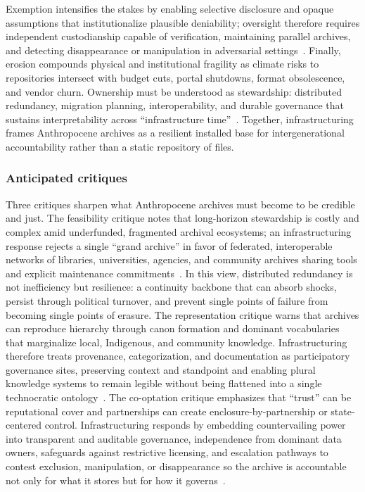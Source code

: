 \documentclass[acmsmall,screen]{acmart}
\begin{document}
Exemption intensifies the stakes by enabling selective disclosure and opaque assumptions that institutionalize plausible deniability; oversight therefore requires independent custodianship capable of verification, maintaining parallel archives, and detecting disappearance or manipulation in adversarial settings~\cite{viebachEvidenceUseArchives2022,ghaddarSpectreArchiveTruth2016}. Finally, erosion compounds physical and institutional fragility as climate risks to repositories intersect with budget cuts, portal shutdowns, format obsolescence, and vendor churn. Ownership must be understood as stewardship: distributed redundancy, migration planning, interoperability, and durable governance that sustains interpretability across ``infrastructure time''~\cite{rydenArchivistsTimeConceptions2019,danielaagostinhoBigDataTime2016,wessellKeepingArchivesWater2023}. Together, infrastructuring frames Anthropocene archives as a resilient installed base for intergenerational accountability rather than a static repository of files.

\subsubsection*{Anticipated critiques}
Three critiques sharpen what Anthropocene archives must become to be credible and just. The feasibility critique notes that long-horizon stewardship is costly and complex amid underfunded, fragmented archival ecosystems; an infrastructuring response rejects a single ``grand archive'' in favor of federated, interoperable networks of libraries, universities, agencies, and community archives sharing tools and explicit maintenance commitments~\cite{tanseyArchivalAdaptationClimate2015,mazurczykAmericanArchivesClimate2018,robinsonComeHellHigh2021}. In this view, distributed redundancy is not inefficiency but resilience: a continuity backbone that can absorb shocks, persist through political turnover, and prevent single points of failure from becoming single points of erasure. The representation critique warns that archives can reproduce hierarchy through canon formation and dominant vocabularies that marginalize local, Indigenous, and community knowledge. Infrastructuring therefore treats provenance, categorization, and documentation as participatory governance sites, preserving context and standpoint and enabling plural knowledge systems to remain legible without being flattened into a single technocratic ontology~\cite{woodMobilizingRecordsReframing2014,carbajalCriticalDigitalArchives2021a}. The co-optation critique emphasizes that ``trust'' can be reputational cover and partnerships can create enclosure-by-partnership or state-centered control. Infrastructuring responds by embedding countervailing power into transparent and auditable governance, independence from dominant data owners, safeguards against restrictive licensing, and escalation pathways to contest exclusion, manipulation, or disappearance so the archive is accountable not only for what it stores but for how it governs~\cite{blankeReassemblingDigitalArchives2024,viebachEvidenceUseArchives2022}.
\end{document}
